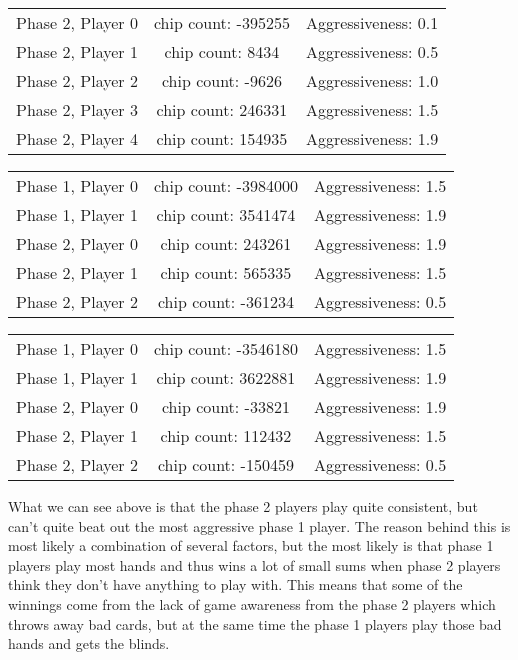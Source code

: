 \documentclass[titlepage, a4paper]{article}
\begin{document}
\begin{tabular}{| l | c | r |}
	\hline
	Phase 2, Player 0 & chip count: -395255 & Aggressiveness: 0.1\\
	Phase 2, Player 1 & chip count: 8434 & Aggressiveness: 0.5\\
	Phase 2, Player 2 & chip count: -9626 & Aggressiveness: 1.0\\
	Phase 2, Player 3 & chip count: 246331 & Aggressiveness: 1.5\\
	Phase 2, Player 4 & chip count: 154935 & Aggressiveness: 1.9\\
	\hline
\end{tabular}

\begin{tabular}{| l | c | r |}
	\hline
	Phase 1, Player 0 & chip count: -3984000 & Aggressiveness: 1.5\\
	Phase 1, Player 1 & chip count: 3541474 & Aggressiveness: 1.9\\
	Phase 2, Player 0 & chip count: 243261 & Aggressiveness: 1.9\\
	Phase 2, Player 1 & chip count: 565335 & Aggressiveness: 1.5\\
	Phase 2, Player 2 & chip count: -361234 & Aggressiveness: 0.5\\
	\hline
\end{tabular}

\begin{tabular}{| l | c | r |}
	\hline
	Phase 1, Player 0 & chip count: -3546180 & Aggressiveness: 1.5\\
	Phase 1, Player 1 & chip count: 3622881 & Aggressiveness: 1.9\\
	Phase 2, Player 0 & chip count: -33821 & Aggressiveness: 1.9\\
	Phase 2, Player 1 & chip count: 112432 & Aggressiveness: 1.5\\
	Phase 2, Player 2 & chip count: -150459 & Aggressiveness: 0.5\\
	\hline
\end{tabular}

What we can see above is that the phase 2 players play quite consistent, but can't
quite beat out the most aggressive phase 1 player. The reason behind this is most likely
a combination of several factors, but the most likely is that phase 1 players play
most hands and thus wins a lot of small sums when phase 2 players think they don't
have anything to play with. This means that some of the winnings come from the lack
of game awareness from the phase 2 players which throws away bad cards, but at the
same time the phase 1 players play those bad hands and gets the blinds.
\end{document}
